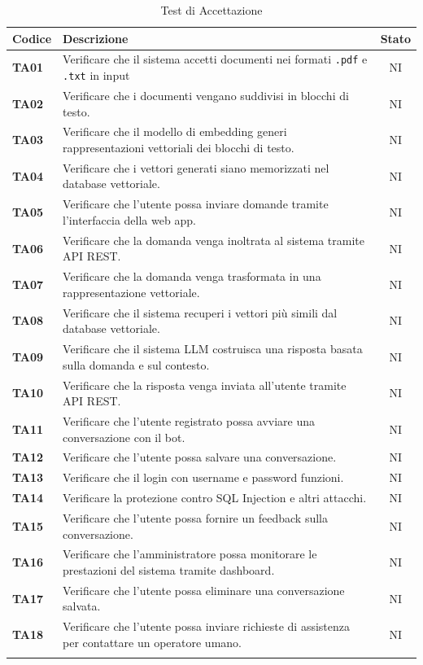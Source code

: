 \documentclass{article}
\begin{document}
\begin{longtable}{|>{\centering\arraybackslash}m{}|>{\raggedright\arraybackslash}m{}|c|}
    \hline
    \textbf{Codice} & \textbf{Descrizione} & \textbf{Stato} \\
    \hline
    \textbf{TA01} & Verificare che il sistema accetti documenti nei formati \texttt{.pdf} e \texttt{.txt} in input & NI \\
    \hline
    \textbf{TA02} & Verificare che i documenti vengano suddivisi in blocchi di testo. & NI \\
    \hline
    \textbf{TA03} & Verificare che il modello di embedding generi rappresentazioni vettoriali dei blocchi di testo. & NI\\
    \hline
    \textbf{TA04} & Verificare che i vettori generati siano memorizzati nel database vettoriale. & NI\\
    \hline
    \textbf{TA05} & Verificare che l’utente possa inviare domande tramite l’interfaccia della web app.& NI\\
    \hline
    \textbf{TA06} & Verificare che la domanda venga inoltrata al sistema tramite API REST. & NI\\
    \hline
    \textbf{TA07} & Verificare che la domanda venga trasformata in una rappresentazione vettoriale. & NI\\
    \hline
    \textbf{TA08} & Verificare che il sistema recuperi i vettori più simili dal database vettoriale. & NI\\
    \hline
    \textbf{TA09} & Verificare che il sistema LLM costruisca una risposta basata sulla domanda e sul contesto. & NI\\
    \hline
    \textbf{TA10} & Verificare che la risposta venga inviata all’utente tramite API REST.& NI\\
    \hline
    \textbf{TA11} & Verificare che l’utente registrato possa avviare una conversazione con il bot.& NI\\
    \hline
    \textbf{TA12} & Verificare che l’utente possa salvare una conversazione.& NI\\
    \hline
    \textbf{TA13} & Verificare che il login con username e password funzioni.& NI\\
    \hline
    \textbf{TA14} & Verificare la protezione contro SQL Injection e altri attacchi. & NI\\
    \hline
    \textbf{TA15} & Verificare che l’utente possa fornire un feedback sulla conversazione. & NI\\
    \hline
    \textbf{TA16} & Verificare che l’amministratore possa monitorare le prestazioni del sistema tramite dashboard. & NI\\
    \hline
    \textbf{TA17} & Verificare che l’utente possa eliminare una conversazione salvata.& NI\\
    \hline
    \textbf{TA18} & Verificare che l’utente possa inviare richieste di assistenza per contattare un operatore umano.& NI\\
    \hline
    \caption{Test di Accettazione}
\end{longtable}
\end{document}
